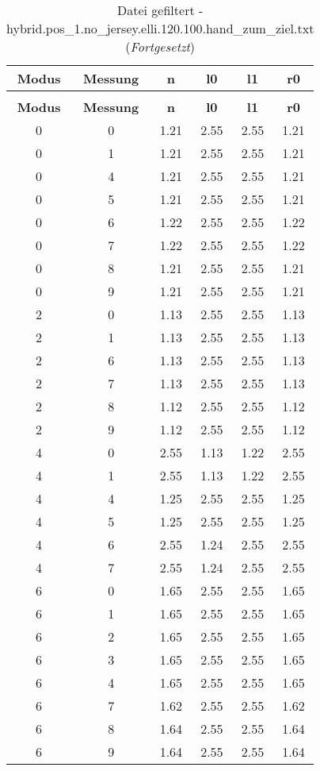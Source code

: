 \begin{longtable}{|c|c||c||c|c||c|}
	\caption{Datei gefiltert - hybrid.pos\_1.no\_jersey.elli.120.100.hand\_zum\_ziel.txt} \label{tab:hybrid.pos-1.no-jersey.elli.120.100.hand-zum-ziel.txt} \\ \hline
	\textbf{Modus} & \textbf{Messung} & \textbf{n} & \textbf{l0} & \textbf{l1} & \textbf{r0}\\ \hline
	\endfirsthead
	\caption[]{Datei gefiltert - hybrid.pos\_1.no\_jersey.elli.120.100.hand\_zum\_ziel.txt (\emph{Fortgesetzt})} \\ \hline
	\textbf{Modus} & \textbf{Messung} & \textbf{n} & \textbf{l0} & \textbf{l1} & \textbf{r0}\\ \hline
	\endhead
	0 & 0 & 1.21 & 2.55 & 2.55 & 1.21 \\ \hline
	0 & 1 & 1.21 & 2.55 & 2.55 & 1.21 \\ \hline
	0 & 4 & 1.21 & 2.55 & 2.55 & 1.21 \\ \hline
	0 & 5 & 1.21 & 2.55 & 2.55 & 1.21 \\ \hline
	0 & 6 & 1.22 & 2.55 & 2.55 & 1.22 \\ \hline
	0 & 7 & 1.22 & 2.55 & 2.55 & 1.22 \\ \hline
	0 & 8 & 1.21 & 2.55 & 2.55 & 1.21 \\ \hline
	0 & 9 & 1.21 & 2.55 & 2.55 & 1.21 \\ \hline
	2 & 0 & 1.13 & 2.55 & 2.55 & 1.13 \\ \hline
	2 & 1 & 1.13 & 2.55 & 2.55 & 1.13 \\ \hline
	2 & 6 & 1.13 & 2.55 & 2.55 & 1.13 \\ \hline
	2 & 7 & 1.13 & 2.55 & 2.55 & 1.13 \\ \hline
	2 & 8 & 1.12 & 2.55 & 2.55 & 1.12 \\ \hline
	2 & 9 & 1.12 & 2.55 & 2.55 & 1.12 \\ \hline
	4 & 0 & 2.55 & 1.13 & 1.22 & 2.55 \\ \hline
	4 & 1 & 2.55 & 1.13 & 1.22 & 2.55 \\ \hline
	4 & 4 & 1.25 & 2.55 & 2.55 & 1.25 \\ \hline
	4 & 5 & 1.25 & 2.55 & 2.55 & 1.25 \\ \hline
	4 & 6 & 2.55 & 1.24 & 2.55 & 2.55 \\ \hline
	4 & 7 & 2.55 & 1.24 & 2.55 & 2.55 \\ \hline
	6 & 0 & 1.65 & 2.55 & 2.55 & 1.65 \\ \hline
	6 & 1 & 1.65 & 2.55 & 2.55 & 1.65 \\ \hline
	6 & 2 & 1.65 & 2.55 & 2.55 & 1.65 \\ \hline
	6 & 3 & 1.65 & 2.55 & 2.55 & 1.65 \\ \hline
	6 & 4 & 1.65 & 2.55 & 2.55 & 1.65 \\ \hline
	6 & 7 & 1.62 & 2.55 & 2.55 & 1.62 \\ \hline
	6 & 8 & 1.64 & 2.55 & 2.55 & 1.64 \\ \hline
	6 & 9 & 1.64 & 2.55 & 2.55 & 1.64 \\ \hline
\end{longtable}

